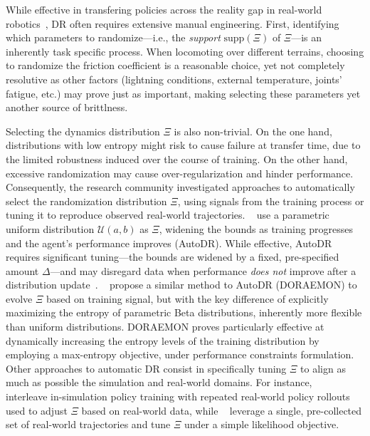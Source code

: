 While effective in transfering policies across the reality gap in real-world robotics~\citep{tobinDomainRandomizationTransferring2017,akkayaSolvingRubiksCube2019, jiDribbleBotDynamicLegged2023,tiboniDomainRandomizationEntropy2024}, DR often requires extensive manual engineering.
First, identifying which parameters to randomize---i.e., the \emph{support} \( \text{supp} (\Xi) \) of \( \Xi \)---is an inherently task specific process.
When locomoting over different terrains, choosing to randomize the friction coefficient is a reasonable choice, yet not completely resolutive as other factors (lightning conditions, external temperature, joints' fatigue, etc.) may prove just as important, making selecting these parameters yet another source of brittlness.

Selecting the dynamics distribution \( \Xi \) is also non-trivial.
On the one hand, distributions with low entropy might risk to cause failure at transfer time, due to the limited robustness induced over the course of training.
On the other hand, excessive randomization may cause over-regularization and hinder performance.
Consequently, the research community investigated approaches to automatically select the randomization distribution \( \Xi \), using signals from the training process or tuning it to reproduce observed real-world trajectories.
~\citet{akkayaSolvingRubiksCube2019} use a parametric uniform distribution \( \mathcal U(a, b) \) as \( \Xi \), widening the bounds as training progresses and the agent's performance improves (AutoDR).
While effective, AutoDR requires significant tuning---the bounds are widened by a fixed, pre-specified amount \( \Delta \)---and may disregard data when performance \emph{does not} improve after a distribution update~\citep{tiboniDomainRandomizationEntropy2024}.
~\citet{tiboniDomainRandomizationEntropy2024} propose a similar method to AutoDR (DORAEMON) to evolve \( \Xi \) based on training signal, but with the key difference of explicitly maximizing the entropy of parametric Beta distributions, inherently more flexible than uniform distributions.
DORAEMON proves particularly effective at dynamically increasing the entropy levels of the training distribution by employing a max-entropy objective, under performance constraints formulation.
Other approaches to automatic DR consist in specifically tuning \( \Xi \) to align as much as possible the simulation and real-world domains.
For instance, ~\citet{chebotar2019closing} interleave in-simulation policy training with repeated real-world policy rollouts used to adjust \( \Xi \) based on real-world data, while ~\citet{tiboniDROPOSimtoRealTransfer2023} leverage a single, pre-collected set of real-world trajectories and tune \( \Xi \) under a simple likelihood objective.

